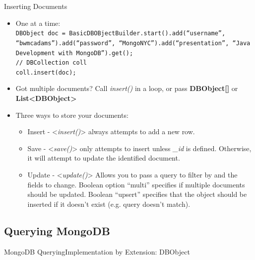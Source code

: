 \documentclass{beamer}
\begin{document}
\begin{frame}{Inserting Documents}
    \begin{itemize}
        \item One at a time:\\
            \texttt{\tiny DBObject doc = BasicDBOBjectBuilder.start().add(``username'', ``bwmcadams'').add(``password'', ``MongoNYC'').add(``presentation'', ``Java Development with MongoDB'').get();\\
            // DBCollection coll\\
            coll.insert(doc);\\
            }
        \item Got multiple documents? Call {\em insert()} in a loop, or pass {\bf DBObject[]} or {\bf List<DBObject>}
        \item Three ways to store your documents:
        \begin{itemize}
            \item {\sc Insert} - <{\em insert()}> always attempts to add a new row.
            \item {\sc Save} - <{\em save()}> only attempts to insert unless {\em \_id} is defined.  Otherwise, it will attempt to update the identified document.
            \item {\sc Update} - <{\em update()}> Allows you to pass a query to filter by and the fields to change.  Boolean option ``multi'' specifies if multiple documents should be updated.  Boolean ``upsert'' specifies that the object should be inserted if it doesn't exist (e.g. query doesn't match).
        \end{itemize}
    \end{itemize}
\end{frame}

\subsection[Querying MongoDB]{Querying MongoDB}

\begin{frame}{MongoDB Querying}{Implementation by Extension: DBObject}
\end{frame}
\end{document}
